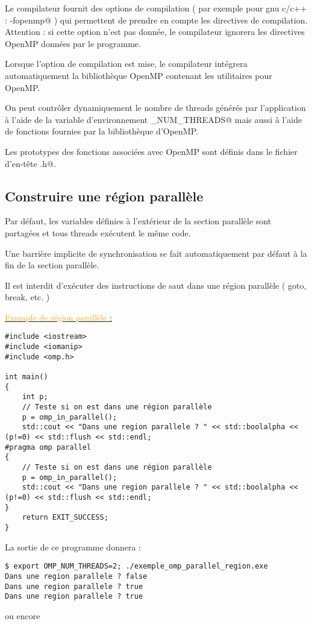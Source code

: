\documentclass[fleqn,11pt]{article}
\begin{document}
Le compilateur fournit des options de compilation ( par exemple pour gnu c/c++ : \verb@-fopenmp@ ) qui permettent de prendre en compte
les directives de compilation. Attention : si cette option n'est pas donnée, le compilateur ignorera les directives OpenMP données par le programme.

Lorsque l'option de compilation est mise, le compilateur intégrera automatiquement la bibliothèque OpenMP contenant les utilitaires pour
OpenMP. 

On peut contrôler dynamiquement le nombre de threads générés par l'application à l'aide de 
la variable d'environnement \verb@OMP_NUM_THREADS@ mais aussi à l'aide de fonctions fournies par la bibliothèque d'OpenMP.

Les prototypes des fonctions associées avec OpenMP sont définis dans le fichier d'en-tête \lstinline@omp.h@.

\subsection{Construire une région parallèle}

Par défaut, les variables définies à l'extérieur de la section parallèle
sont partagées et tous threads exécutent le même code.

Une barrière implicite de synchronisation se fait automatiquement par défaut à la fin de la section parallèle.

Il est interdit d'exécuter des instructions de saut dans une région parallèle ( goto, break, etc. )

\underline{\textcolor{orange}{Exemple de région parallèle} :}
\begin{lstlisting}
#include <iostream>
#include <iomanip>
#include <omp.h>

int main()
{
    int p;
    // Teste si on est dans une région parallèle
    p = omp_in_parallel();
    std::cout << "Dans une region parallele ? " << std::boolalpha << (p!=0) << std::flush << std::endl;
#pragma omp parallel
{
    // Teste si on est dans une région parallèle
    p = omp_in_parallel();
    std::cout << "Dans une region parallele ? " << std::boolalpha << (p!=0) << std::flush << std::endl;
}
    return EXIT_SUCCESS;
}\end{lstlisting}

La sortie de ce programme donnera :
\begin{verbatim}
$ export OMP_NUM_THREADS=2; ./exemple_omp_parallel_region.exe
Dans une region parallele ? false
Dans une region parallele ? true
Dans une region parallele ? true
\end{verbatim}
 ou encore
\end{document}
